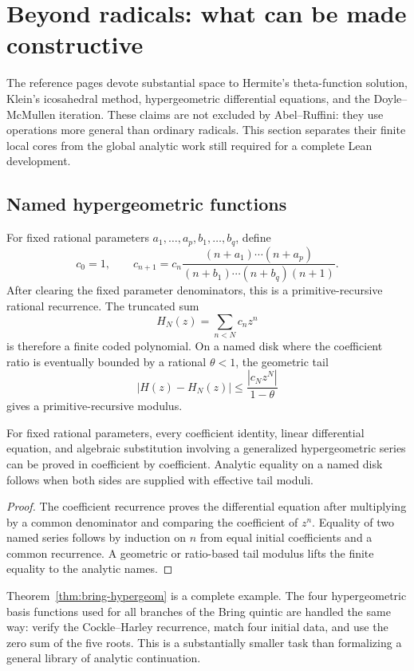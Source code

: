 \section{Beyond radicals: what can be made constructive}\label{sec:beyond}

The reference pages devote substantial space to Hermite's theta-function
solution, Klein's icosahedral method, hypergeometric differential equations,
and the Doyle--McMullen iteration.  These claims are not excluded by
Abel--Ruffini: they use operations more general than ordinary radicals.  This
section separates their finite local cores from the global analytic work still
required for a complete Lean development.

\subsection{Named hypergeometric functions}

For fixed rational parameters \(a_1,\ldots,a_p,b_1,\ldots,b_q\), define
\[
 c_0=1,
 \qquad
 c_{n+1}=c_n
 \frac{(n+a_1)\cdots(n+a_p)}{(n+b_1)\cdots(n+b_q)(n+1)}.
\]
After clearing the fixed parameter denominators, this is a primitive-recursive
rational recurrence.  The truncated sum
\[
 H_N(z)=\sum_{n<N}c_nz^n
\]
is therefore a finite coded polynomial.  On a named disk where the coefficient
ratio is eventually bounded by a rational \(\theta<1\), the geometric tail
\[
 \left|H(z)-H_N(z)\right|
 \le \frac{|c_Nz^N|}{1-\theta}
\]
gives a primitive-recursive modulus.

\begin{proposition}
For fixed rational parameters, every coefficient identity, linear differential
equation, and algebraic substitution involving a generalized hypergeometric
series can be proved in \ipra{} coefficient by coefficient.  Analytic equality
on a named disk follows when both sides are supplied with effective tail
moduli.
\end{proposition}

\begin{proof}
The coefficient recurrence proves the differential equation after multiplying
by a common denominator and comparing the coefficient of \(z^n\).  Equality of
two named series follows by induction on \(n\) from equal initial coefficients
and a common recurrence.  A geometric or ratio-based tail modulus lifts the
finite equality to the analytic names.
\end{proof}

Theorem~\ref{thm:bring-hypergeom} is a complete example.  The four
hypergeometric basis functions used for all branches of the Bring quintic are
handled the same way: verify the Cockle--Harley recurrence, match four initial
data, and use the zero sum of the five roots.  This is a substantially smaller
task than formalizing a general library of analytic continuation.

